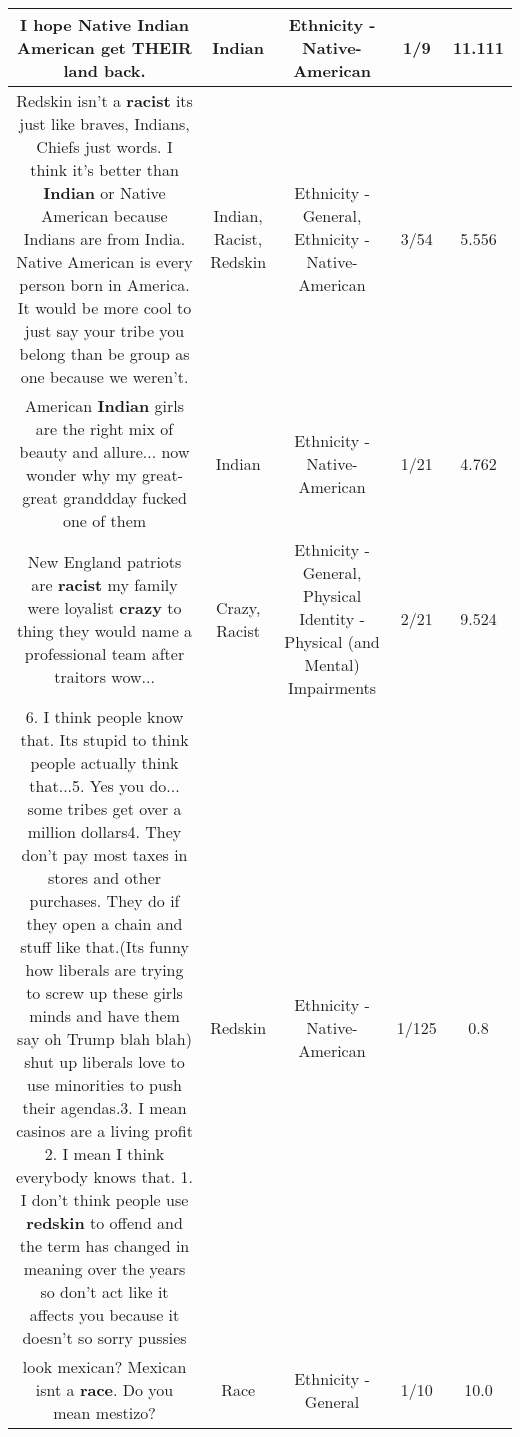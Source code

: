 \documentclass[11pt]{article}
\newlength\mylength
\begin{document}
\begin{center}
\begin{longtable}{|C{.65\mylength}|C{.30\mylength}|C{.12\mylength}|C{.12\mylength}|C{.12\mylength}|}
  \small I hope Native \textbf{Indian} American get THEIR land back.\normalsize   & Indian & Ethnicity - Native-American & 1/9 & 11.111 \\  \hline
  \small Redskin isn't a \textbf{racist} its just like braves, Indians, Chiefs just words. I think it's better than \textbf{Indian} or Native American because Indians are from India. Native American is every person born in America. It would be more cool to just say your tribe you belong than be group as one because we weren't.\normalsize   & Indian, Racist, Redskin & Ethnicity - General, Ethnicity - Native-American & 3/54 & 5.556 \\  \hline
  \small American \textbf{Indian} girls are the right mix of beauty and allure... now wonder why my great-great granddday fucked one of them\normalsize   & Indian & Ethnicity - Native-American & 1/21 & 4.762 \\  \hline
  \small New England patriots are \textbf{racist} my family were loyalist \textbf{crazy} to thing they would name a professional team after traitors wow...\normalsize   & Crazy, Racist & Ethnicity - General, Physical Identity - Physical (and Mental) Impairments & 2/21 & 9.524 \\  \hline
  \small 6. I think people know that. Its stupid to think people actually think that...5. Yes you do... some tribes get over a million dollars4. They don't pay most taxes in stores and other purchases. They do if they open a chain and stuff like that.(Its funny how liberals are trying to screw up these girls minds and have them say oh Trump blah blah) shut up liberals love to use minorities to push their agendas.3. I mean casinos are a living profit 2. I mean I think everybody knows that. 1. I don't think people use \textbf{redskin} to offend and the term has changed in meaning over the years so don't act like it affects you because it doesn't  so sorry pussies\normalsize   & Redskin & Ethnicity - Native-American & 1/125 & 0.8 \\  \hline
  \small look mexican? Mexican isnt a \textbf{race}. Do you mean mestizo?\normalsize   & Race & Ethnicity - General & 1/10 & 10.0 \\  \hline

\end{longtable}
\end{center}
\end{document}
